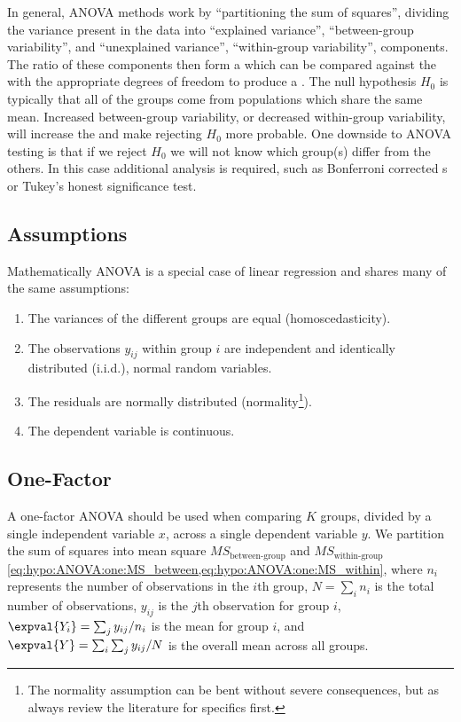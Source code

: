 In general, ANOVA methods work by ``partitioning the sum of squares'',
\ie dividing the variance present in the data into
``explained variance'', \ie ``between-group variability'',
and
``unexplained variance'', \ie ``within-group variability'',
components.
The ratio of these components then form a \Fstat
which can be compared against the \Fdist
with the appropriate degrees of freedom to produce a \pvalue.
The null hypothesis $H_{0}$ is typically that all of the groups come from populations which share the same mean.
Increased between-group variability, or decreased within-group variability,
will increase the \Fstat and make rejecting $H_{0}$ more probable.
One downside to ANOVA testing is that if we reject $H_{0}$
we will not know which group(s) differ from the others.
In this case additional \posthoc analysis is required,
such as Bonferroni corrected {\ttest}s or Tukey's honest significance test.

\subsection{Assumptions}
\label{hypo:ANOVA:assumptions}

Mathematically ANOVA is a special case of linear regression
and shares many of the same assumptions:

\begin{enumerate}[noitemsep]
  \item The variances of the different groups are equal (homoscedasticity).
  \item The observations $y_{ij}$ within group $i$ are independent and identically distributed (i.i.d.), normal random variables.
  \item The residuals are normally distributed (normality\footnote{The normality assumption can be bent without severe consequences, but as always review the literature for specifics first.}).
  \item The dependent variable is continuous.
\end{enumerate}

\subsection{One-Factor}
\label{hypo:ANOVA:one}

A one-factor ANOVA should be used when comparing $K$ groups,
divided by a single independent variable $x$,
across a single dependent variable $y$.
We partition the sum of squares into
mean square $MS_{\text{between-group}}$ and $MS_{\text{within-group}}$
\cref{eq:hypo:ANOVA:one:MS_between,eq:hypo:ANOVA:one:MS_within}, where
$n_{i}$ represents the number of observations in the $i$th group,
$N = \sum_{i} n_{i}$ is the total number of observations,
$y_{ij}$ is the $j$th observation for group $i$,
$\expval{Y_{i}} = \sum_{j} y_{ij} / n_{i}$ is the mean for group $i$,
and $\expval{Y} = \sum_{i}\sum_{j} y_{ij} / N$ is the overall mean across all groups.

